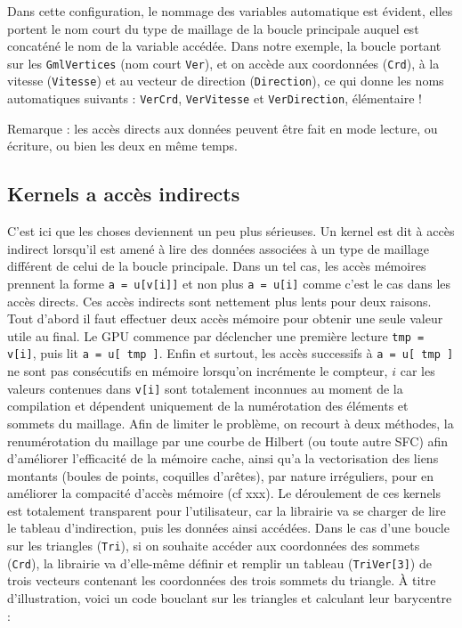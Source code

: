 \documentclass[a4paper,12pt]{article}
\begin{document}
Dans cette configuration, le nommage des variables automatique est évident, elles portent le nom court du type de maillage de la boucle principale auquel est concaténé le nom de la variable accédée.
Dans notre exemple, la boucle portant sur les {\tt GmlVertices} (nom court {\tt Ver}), et on accède aux coordonnées ({\tt Crd}), à la vitesse ({\tt Vitesse}) et au vecteur de direction ({\tt Direction}), ce qui donne les noms automatiques suivants : {\tt VerCrd}, {\tt VerVitesse} et {\tt VerDirection}, élémentaire !

Remarque : les accès directs aux données peuvent être fait en mode lecture, ou écriture, ou bien les deux en même temps.

\subsection{Kernels a accès indirects}
\label{sec:kernels_indirects}
C'est ici que les choses deviennent un peu plus sérieuses.
Un kernel est dit à accès indirect lorsqu'il est amené à lire des données associées à un type de maillage différent de celui de la boucle principale.
Dans un tel cas, les accès mémoires prennent la forme {\tt a = u[v[i]]} et non plus {\tt a = u[i]} comme c'est le cas dans les accès directs.
Ces accès indirects sont nettement plus lents pour deux raisons.
Tout d'abord il faut effectuer deux accès mémoire pour obtenir une seule valeur utile au final.
Le GPU commence par déclencher une première lecture {\tt tmp = v[i]}, puis lit {\tt a = u[ tmp ]}.
Enfin et surtout, les accès successifs à {\tt a = u[ tmp ]} ne sont pas consécutifs en mémoire lorsqu'on incrémente le compteur, $i$ car les valeurs contenues dans {\tt v[i]} sont totalement inconnues au moment de la compilation et dépendent uniquement de la numérotation des éléments et sommets du maillage.
Afin de limiter le problème, on recourt à deux méthodes, la renumérotation du maillage par une courbe de Hilbert (ou toute autre SFC) afin d'améliorer l'efficacité de la mémoire cache, ainsi qu'a la vectorisation des liens montants (boules de points, coquilles d'arêtes), par nature irréguliers, pour en améliorer la compacité d'accès mémoire (cf xxx).
Le déroulement de ces kernels est totalement transparent pour l'utilisateur, car la librairie va se charger de lire le tableau d'indirection, puis les données ainsi accédées.
Dans le cas d'une boucle sur les triangles ({\tt Tri}), si on souhaite accéder aux coordonnées des sommets ({\tt Crd}), la librairie va d'elle-même définir et remplir un tableau ({\tt TriVer[3]}) de trois vecteurs contenant les coordonnées des trois sommets du triangle.
À titre d'illustration, voici un code bouclant sur les triangles et calculant leur barycentre :
\end{document}
